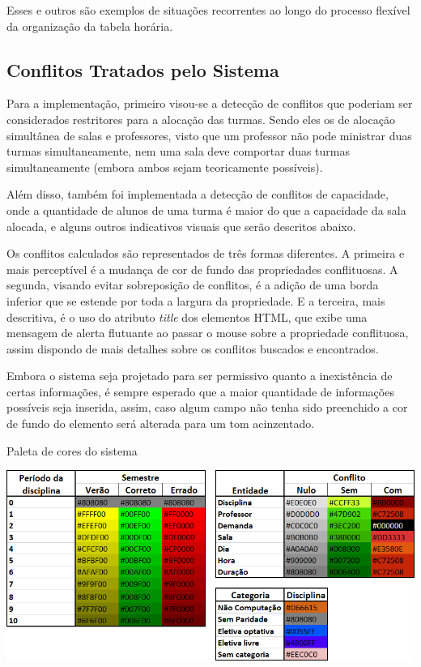 Esses e outros são exemplos de situações recorrentes ao longo do processo flexível da organização da tabela horária.

\subsection{Conflitos Tratados pelo Sistema}

Para a implementação, primeiro visou-se a detecção de conflitos que poderiam ser considerados restritores para a alocação das turmas. Sendo eles os de alocação simultânea de salas e professores, visto que um professor não pode ministrar duas turmas simultaneamente, nem uma sala deve comportar duas turmas simultaneamente (embora ambos sejam teoricamente possíveis).

Além disso, também foi implementada a detecção de conflitos de capacidade, onde a quantidade de alunos de uma turma é maior do que a capacidade da sala alocada, e alguns outros indicativos visuais que serão descritos abaixo.

Os conflitos calculados são representados de três formas diferentes. A primeira e mais perceptível é a mudança de cor de fundo das propriedades conflituosas. A segunda, visando evitar sobreposição de conflitos, é a adição de uma borda inferior que se estende por toda a largura da propriedade. E a terceira, mais descritiva, é o uso do atributo \textit{title} dos elementos HTML, que exibe uma mensagem de alerta flutuante ao passar o mouse sobre a propriedade conflituosa, assim dispondo de mais detalhes sobre os conflitos buscados e encontrados. %

Embora o sistema seja projetado para ser permissivo quanto a inexistência de certas informações, é sempre esperado que a maior quantidade de informações possíveis seja inserida, assim, caso algum campo não tenha sido preenchido a cor de fundo do elemento será alterada para um tom acinzentado.

\begin{MyCenteredFigure}
  \caption{Paleta de cores do sistema}
  \label{fig:conflitoDisciplinaPaleta}
  \includegraphics[width=\textwidth]{files/img/2.02!5-desenvolvimento/2.02!5.1.5-conflitos/Paleta de Cores}
\end{MyCenteredFigure}

